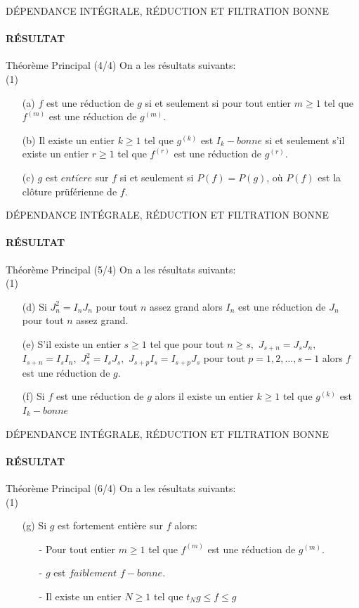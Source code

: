 \documentclass[11pt,a4paper]{beamer}
\begin{document}
\begin{frame}{DÉPENDANCE INTÉGRALE, RÉDUCTION ET FILTRATION BONNE}
	\framesubtitle{RÉSULTAT}
	\begin{block}{Théorème Principal (4/4)}
		On a les résultats suivants:\\
		(1)
		\begin{enumerate}
			\item[(a)] $f$ est une réduction de $g$ si et seulement si pour tout entier $m\geq 1$ tel que $f^{(m)}$ est une réduction de $g^{(m)}.$ 
			\item[(b)] Il existe un entier $k\geq 1$ tel que $g^{(k)}$ est $I_{k}-bonne$ si et seulement s'il existe un entier $r\geq 1$ tel que $f^{(r)}$ est une réduction de $g^{(r)}.$
			\item[(c)] $g$ est $enti\grave{e}re$ sur $f$ si et seulement si $P(f)=P(g)$, o\`{u} $P(f)$ est la clôture prüférienne de $f.$
		\end{enumerate}
	\end{block}
\end{frame}

\begin{frame}{DÉPENDANCE INTÉGRALE, RÉDUCTION ET FILTRATION BONNE}
	\framesubtitle{RÉSULTAT}
	\begin{block}{Théorème Principal (5/4)}
		On a les résultats suivants:\\
		(1)
		\begin{enumerate}
			\item[(d)]Si $J_{n}^{2}=I_{n}J_{n}$ pour tout $n$ assez grand alors $I_{n}$ est une réduction de $J_{n}$ pour tout $n$ assez grand. 
			\item[(e)]S'il existe un entier $s\geq 1$ tel que pour tout $n\geq s,$ $J_{s+n}=J_{s}J_{n},$ $I_{s+n}=I_{s}I_{n},$ $J_{s}^{2}=I_{s}J_{s},$ $J_{s+p}I_{s}=I_{s+p}J_{s}$ pour tout $p=1,2,...,s-1$ alors $f$ est une réduction de $g.$
			\item[(f)]Si $f$ est une réduction de $g$ alors il existe un entier $k\geq 1$ tel que $g^{(k)}$ est $I_{k}-bonne$
		\end{enumerate}
	\end{block}
\end{frame}

\begin{frame}{DÉPENDANCE INTÉGRALE, RÉDUCTION ET FILTRATION BONNE}
	\framesubtitle{RÉSULTAT}
	\begin{block}{Théorème Principal (6/4)}
		On a les résultats suivants:\\
		(1)
		\begin{enumerate}
			\item[(g)] Si $g$ est fortement entière sur $f$ alors:
			\begin{enumerate}
				\item[-] Pour tout entier $m\geq 1$ tel que $f^{(m)}$ est une réduction de $g^{(m)}.$
				\item[-] $g$ est $faiblement$ $f-bonne.$
				\item[-] Il existe un entier $N\geq 1$ tel que $t_{N}g\leq f\leq g$
			\end{enumerate}
		\end{enumerate}
	\end{block}
\end{frame}

\end{document}
